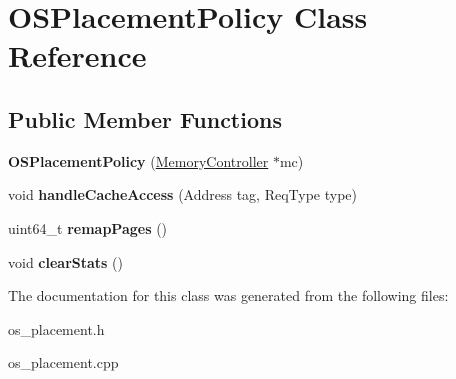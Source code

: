 \hypertarget{classOSPlacementPolicy}{\section{O\-S\-Placement\-Policy Class Reference}
\label{classOSPlacementPolicy}
}
\subsection*{Public Member Functions}
\begin{DoxyCompactItemize}
\item 
\hypertarget{classOSPlacementPolicy_aa52442f19657097969032e627cc3d557}{{\bfseries O\-S\-Placement\-Policy} (\hyperlink{classMemoryController}{Memory\-Controller} $\ast$mc)}\label{classOSPlacementPolicy_aa52442f19657097969032e627cc3d557}

\item 
\hypertarget{classOSPlacementPolicy_a978b1b26cd288e0d48091862b0df28c9}{void {\bfseries handle\-Cache\-Access} (Address tag, Req\-Type type)}\label{classOSPlacementPolicy_a978b1b26cd288e0d48091862b0df28c9}

\item 
\hypertarget{classOSPlacementPolicy_a9778f2994d06ac81934d03ed705a1031}{uint64\-\_\-t {\bfseries remap\-Pages} ()}\label{classOSPlacementPolicy_a9778f2994d06ac81934d03ed705a1031}

\item 
\hypertarget{classOSPlacementPolicy_ac10e0c1b10d1a1d6463abdeea407404d}{void {\bfseries clear\-Stats} ()}\label{classOSPlacementPolicy_ac10e0c1b10d1a1d6463abdeea407404d}

\end{DoxyCompactItemize}


The documentation for this class was generated from the following files\-:\begin{DoxyCompactItemize}
\item 
os\-\_\-placement.\-h\item 
os\-\_\-placement.\-cpp\end{DoxyCompactItemize}
